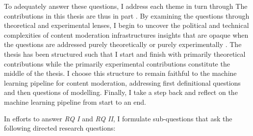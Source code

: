 To adequately answer these questions, I address each theme in turn through 
The contributions in this thesis are thus in part .
By examining the questions through theoretical and experimental lenses, I  begin to uncover the political and technical complexities of content moderation infrastructures
 insights that are opaque when the questions are addressed purely theoretically or purely experimentally .
The thesis has been structured such that I start and finish with primarily theoretical contributions while the primarily experimental contributions constitute the middle of the thesis.
I choose this structure to remain faithful to the machine learning pipeline for content moderation, addressing first definitional questions and then questions of modelling.
Finally, I take a step back and reflect on the machine learning pipeline from start to an end.

In efforts to answer \textit{RQ I} and \textit{RQ II}, I formulate sub-questions that ask the following directed research questions:

